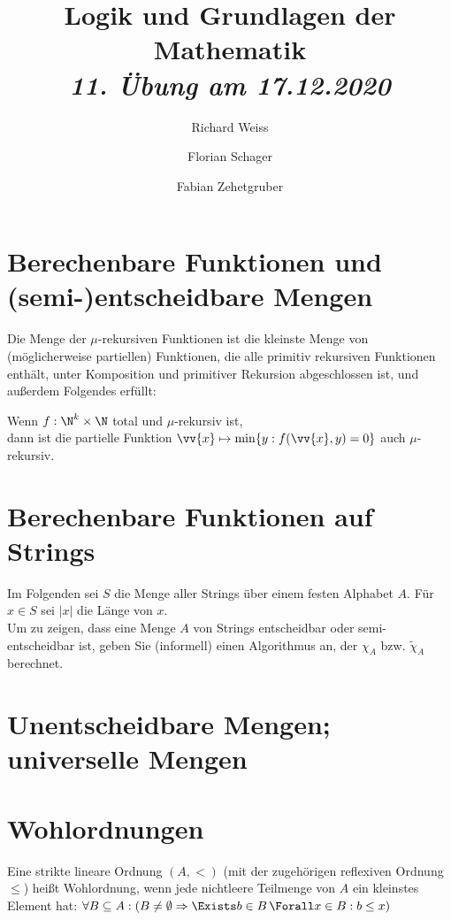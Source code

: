 \documentclass{article}
\title
{
  Logik und Grundlagen der Mathematik \\
  \vspace{4pt}
  \normalsize
  \textit{11. Übung am 17.12.2020}
}
\author
{
  Richard Weiss
  \and
  Florian Schager
  \and
  Fabian Zehetgruber
}
\date{}
\begin{document}
\maketitle

\section*{Berechenbare Funktionen und (semi-)entscheidbare Mengen}

Die Menge der $\mu$-rekursiven Funktionen ist die kleinste Menge von (möglicherweise partiellen)
Funktionen, die alle primitiv rekursiven Funktionen enthält, unter Komposition und
primitiver Rekursion abgeschlossen ist, und außerdem Folgendes erfüllt:

\begin{adjustwidth}{1cm}{}
Wenn $f: \N^k \times \N$ total und $\mu$-rekursiv ist, \\
dann ist die partielle Funktion $\vv{x} \mapsto \min\{y: f(\vv{x},y) = 0\}$ auch
$\mu$-rekursiv.
\end{adjustwidth}




\section*{Berechenbare Funktionen auf Strings}

Im Folgenden sei $S$ die Menge aller Strings über einem festen Alphabet $A$.
Für $x \in S$ sei $|x|$ die Länge von $x$. \\
Um zu zeigen, dass eine Menge $A$ von Strings entscheidbar oder semi-entscheidbar
ist, geben Sie (informell) einen Algorithmus an, der $\chi_A$ bzw. $\tilde{\chi}_A$
berechnet.



\section*{Unentscheidbare Mengen; universelle Mengen}



\section*{Wohlordnungen}

Eine strikte lineare Ordnung $(A, <)$ (mit der zugehörigen reflexiven Ordnung $\leq$)
heißt Wohlordnung, wenn jede nichtleere Teilmenge von $A$ ein kleinstes Element hat:
$\forall B \subseteq A: (B \neq \emptyset \Rightarrow \Exists b \in B\, \Forall x \in B: b \leq x)$





\end{document}
